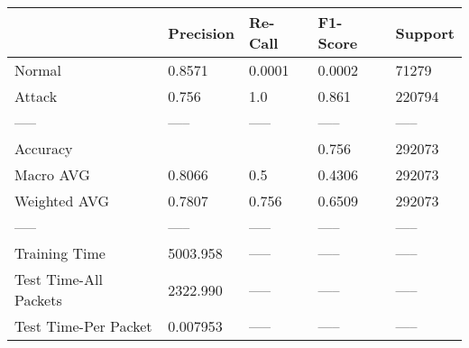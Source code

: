 \begin{tabular}{lllll}
\toprule
{} & Precision & Re-Call & F1-Score & Support \\
\midrule
Normal                &    0.8571 &  0.0001 &   0.0002 &   71279 \\
Attack                &     0.756 &     1.0 &    0.861 &  220794 \\
-----                 &     ----- &   ----- &    ----- &   ----- \\
Accuracy              &           &         &    0.756 &  292073 \\
Macro AVG             &    0.8066 &     0.5 &   0.4306 &  292073 \\
Weighted AVG          &    0.7807 &   0.756 &   0.6509 &  292073 \\
-----                 &     ----- &   ----- &    ----- &   ----- \\
Training Time         &  5003.958 &   ----- &    ----- &   ----- \\
Test Time-All Packets &  2322.990 &   ----- &    ----- &   ----- \\
Test Time-Per Packet  &  0.007953 &   ----- &    ----- &   ----- \\
\bottomrule
\end{tabular}
